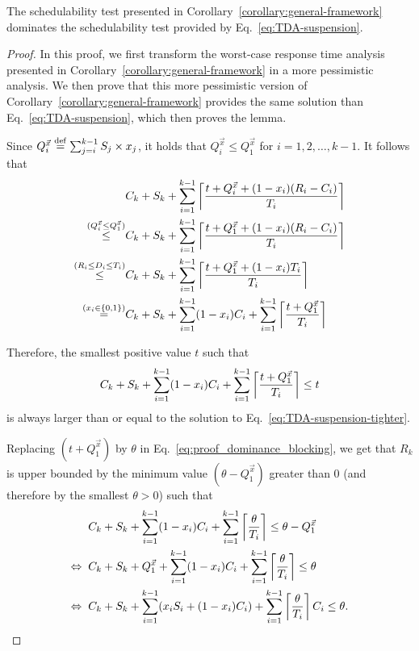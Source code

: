 \begin{Lemma}
  \label{lem:dominance_blocking}
  The schedulability test presented in
  Corollary~\ref{corollary:general-framework} dominates the
  schedulability test provided by Eq.~\eqref{eq:TDA-suspension}.
\end{Lemma}
\begin{proof}
  In this proof, we first transform the worst-case response time analysis presented in Corollary~\ref{corollary:general-framework} in a more pessimistic analysis. We then prove that this more pessimistic version of Corollary~\ref{corollary:general-framework} provides the same solution than Eq.~\eqref{eq:TDA-suspension}, which then proves the lemma.
  
  Since $Q_i^{\vec{x}} \stackrel{\mathrm{def}}{=} \sum_{j=i}^{k-1} S_j \times x_j$, it holds that $Q_i^{\vec{x}} \leq  Q_1^{\vec{x}}$ for $i=1,2,\ldots,k-1$. It follows that
  \begin{align*}
  & C_k + S_k + \sum_{i=1}^{k-1}\left\lceil{\frac{t+Q_i^{\vec{x}}+(1-x_i)(R_i-C_i)}{T_i}}\right\rceil \\
  \stackrel{(Q_i^{\vec{x}} \leq  Q_1^{\vec{x}})}{\leq} & C_k + S_k + \sum_{i=1}^{k-1}\left\lceil{\frac{t+Q_1^{\vec{x}}+(1-x_i)(R_i-C_i)}{T_i}}\right\rceil \\
  \stackrel{(R_i \leq D_i \leq T_i)}{\leq} & C_k + S_k + \sum_{i=1}^{k-1}\left\lceil{\frac{t+Q_1^{\vec{x}}+(1-x_i)T_i}{T_i}}\right\rceil \\
  \stackrel{(x_i \in \{0,1\})}{=} & C_k + S_k + \sum_{i=1}^{k-1} (1-x_i)C_i + \sum_{i=1}^{k-1}\left\lceil{\frac{t+Q_1^{\vec{x}}}{T_i}}\right\rceil \\
  \end{align*}
  
  Therefore, the smallest positive value $t$ such that  
  \begin{equation}
  \label{eq:proof_dominance_blocking}
  C_k + S_k + \sum_{i=1}^{k-1} (1-x_i)C_i + \sum_{i=1}^{k-1}\ceiling{\frac{t+Q_1^{\vec{x}}}{T_i}} \leq t
  \end{equation}
  is always larger than or equal to the solution to Eq.~\eqref{eq:TDA-suspension-tighter}. 
  
  Replacing $(t+Q_1^{\vec{x}})$ by $\theta$ in Eq.~\eqref{eq:proof_dominance_blocking}, we get that $R_k$ is upper bounded by the minimum value $(\theta-Q_1^{\vec{x}})$ greater than $0$ (and therefore by the smallest $\theta > 0$) such that 
  \begin{align}
  & C_k + S_k + \sum_{i=1}^{k-1} (1-x_i)C_i + \sum_{i=1}^{k-1}\ceiling{\frac{\theta}{T_i}}\leq \theta-Q_1^{\vec{x}} \nonumber \\
  \Leftrightarrow \;\; & C_k + S_k + Q_1^{\vec{x}} + \sum_{i=1}^{k-1} (1-x_i)C_i + \sum_{i=1}^{k-1}\ceiling{\frac{\theta}{T_i}}\leq \theta \nonumber \\
\Leftrightarrow \;\; & C_k + S_k + \sum_{i=1}^{k-1}(x_i S_i + (1-x_i) C_i) + \sum_{i=1}^{k-1}\ceiling{\frac{\theta}{T_i}}C_i \leq \theta \label{eq:proof_dominance_blocking_final}.
    \end{align}
    

\end{proof}
